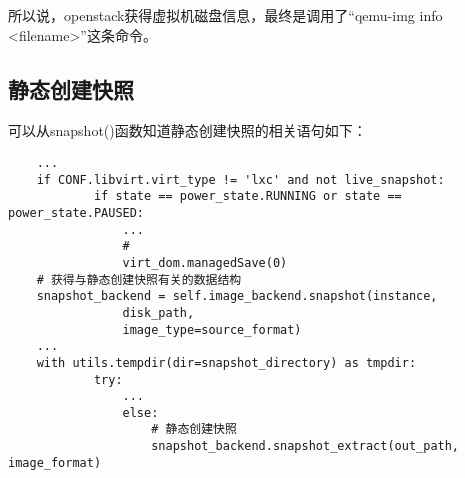 \documentclass[a4paper,left=1.5cm,right=1.5cm,11pt]{article}
\begin{document}
	所以说，openstack获得虚拟机磁盘信息，最终是调用了“qemu-img info <filename>”这条命令。

\subsection{静态创建快照}
	可以从snapshot()函数知道静态创建快照的相关语句如下：
	\begin{lstlisting}
	...
	if CONF.libvirt.virt_type != 'lxc' and not live_snapshot:
            if state == power_state.RUNNING or state == power_state.PAUSED:
                ...
				# 
                virt_dom.managedSave(0)
	# 获得与静态创建快照有关的数据结构
	snapshot_backend = self.image_backend.snapshot(instance,
                disk_path,
                image_type=source_format)
	...
	with utils.tempdir(dir=snapshot_directory) as tmpdir:
            try:
				...
                else:
					# 静态创建快照
                    snapshot_backend.snapshot_extract(out_path, image_format)
	\end{lstlisting}

\clearpage
\end{document}
